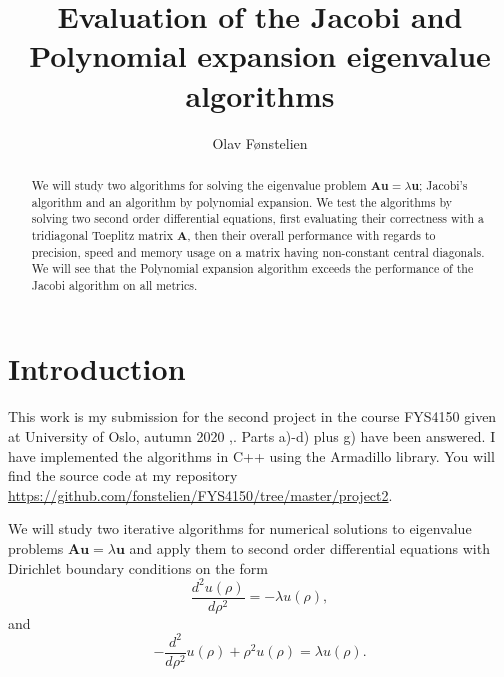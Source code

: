 \documentclass[]{article}
\title{Evaluation of the Jacobi and Polynomial expansion eigenvalue algorithms}
\author{Olav Fønstelien}
\begin{document}
\maketitle

\begin{abstract}
We will study two algorithms for solving the eigenvalue problem $\mathbf{Au} = \lambda \mathbf{u}$; Jacobi's algorithm and an algorithm by polynomial expansion. We test the algorithms by solving two second order differential equations, first evaluating their correctness with a tridiagonal Toeplitz matrix $\mathbf{A}$, then their overall performance with regards to precision, speed and memory usage on a matrix having non-constant central diagonals. We will see that the Polynomial expansion algorithm exceeds the performance of the Jacobi algorithm on all metrics.
\end{abstract}

\section{Introduction}

This work is my submission for the second project in the course FYS4150 given at University of Oslo, autumn 2020 \cite{fys4150},\cite{fys4150-p2}. Parts a)-d) plus g) have been answered. I have implemented the algorithms in C++ using the Armadillo library. You will find the source code at my repository \url{https://github.com/fonstelien/FYS4150/tree/master/project2}.

We will study two iterative algorithms for numerical solutions to eigenvalue problems $\mathbf{Au} = \lambda \mathbf{u}$ and apply them to second order differential equations with Dirichlet boundary conditions on the form
\begin{equation}
\label{diff_1}
	\frac{d^2 u(\rho)}{d\rho^2} = -\lambda u(\rho),
\end{equation}
and
\begin{equation}
\label{diff_2}
	-\frac{d^2}{d\rho^2} u(\rho) + \rho^2u(\rho)  = \lambda u(\rho).
\end{equation}
\end{document}
